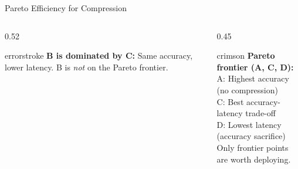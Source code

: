 \documentclass[aspectratio=169, 12pt]{beamer}
\begin{document}
\begin{frame}{Pareto Efficiency for Compression}
\begin{columns}[T]
\begin{column}{0.52\textwidth}
    \vspace{0.05cm}
    \begin{mlsyscard}{errorstroke}
    {\scriptsize \textbf{B is dominated by C:} Same accuracy, lower latency. B is \emph{not} on the Pareto frontier.}
    \end{mlsyscard}
  \end{column}
  \begin{column}{0.45\textwidth}
    \vspace{0.1cm}
    \begin{mlsyscard}{crimson}
    {\scriptsize \textbf{Pareto frontier (A, C, D):}\\[0.05cm]
    A: Highest accuracy (no compression)\\
    C: Best accuracy-latency trade-off\\
    D: Lowest latency (accuracy sacrifice)\\[0.05cm]
    Only frontier points are worth deploying.}
    \end{mlsyscard}

    \vspace{0.1cm}
  \end{column}
\end{columns}

\end{frame}
\end{document}
